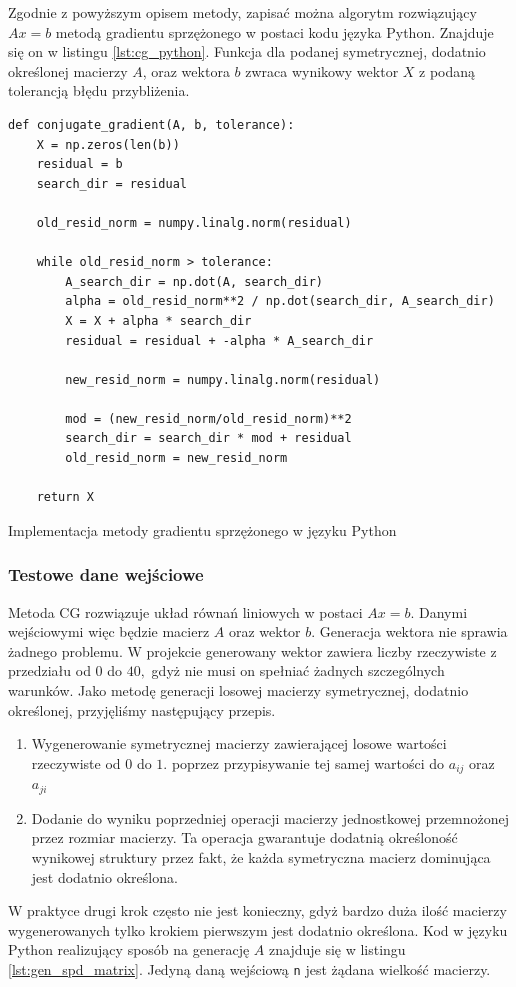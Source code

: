 \documentclass[a4paper,12pt]{book} %
\begin{document}
Zgodnie z powyższym opisem metody, zapisać można algorytm rozwiązujący $Ax = b$ metodą gradientu sprzężonego w postaci kodu języka Python. Znajduje się on w listingu \ref{lst:cg_python}. Funkcja dla podanej symetrycznej, dodatnio określonej macierzy $A$, oraz wektora $b$ zwraca wynikowy wektor $X$ z podaną tolerancją błędu przybliżenia.

\begin{lstfloat}[H]
\lstset{language=Python}
\begin{lstlisting}[frame=single]
def conjugate_gradient(A, b, tolerance):
    X = np.zeros(len(b))
    residual = b
    search_dir = residual

    old_resid_norm = numpy.linalg.norm(residual)

    while old_resid_norm > tolerance:
        A_search_dir = np.dot(A, search_dir)
        alpha = old_resid_norm**2 / np.dot(search_dir, A_search_dir)
        X = X + alpha * search_dir
        residual = residual + -alpha * A_search_dir

        new_resid_norm = numpy.linalg.norm(residual)

        mod = (new_resid_norm/old_resid_norm)**2
        search_dir = search_dir * mod + residual
        old_resid_norm = new_resid_norm

    return X
\end{lstlisting}
\caption{Implementacja metody gradientu sprzężonego w języku Python}
\label{lst:cg_python}
\end{lstfloat}

\subsubsection{Testowe dane wejściowe}
Metoda CG rozwiązuje układ równań liniowych w postaci $Ax = b.$ Danymi wejściowymi więc będzie macierz $A$ oraz wektor $b$. Generacja wektora nie sprawia żadnego problemu. W projekcie generowany wektor zawiera liczby rzeczywiste z przedziału od $0$ do $40,$ gdyż nie musi on spełniać żadnych szczególnych warunków.
Jako metodę generacji losowej macierzy symetrycznej, dodatnio określonej, przyjęliśmy następujący przepis.
\begin{enumerate}
		\item Wygenerowanie symetrycznej macierzy zawierającej losowe wartości rzeczywiste od $0$ do $1.$ poprzez przypisywanie tej samej wartości do $a_{ij}$ oraz $a_{ji}$
		\item Dodanie do wyniku poprzedniej operacji macierzy jednostkowej przemnożonej przez rozmiar macierzy. Ta operacja gwarantuje dodatnią określoność wynikowej struktury przez fakt, że każda symetryczna macierz dominująca jest dodatnio określona.
\end{enumerate}
W praktyce drugi krok często nie jest konieczny, gdyż bardzo duża ilość macierzy wygenerowanych tylko krokiem pierwszym jest dodatnio określona.
Kod w języku Python realizujący sposób na generację $A$ znajduje się w listingu \ref{lst:gen_spd_matrix}. Jedyną daną wejściową \texttt{n} jest żądana wielkość macierzy.
\end{document}
